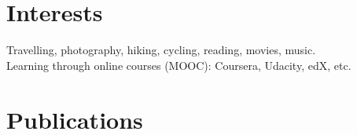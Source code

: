 \documentclass[a4paper,10pt]{article} %
\def \vspac {0.25cm}
\begin{document}
\vspace{\vspac}
\section{Interests}
\vspace{\vspac}
\noindent
Travelling, photography, hiking, cycling, reading, movies, music.  \\
\noindent
Learning through online courses (MOOC): Coursera, Udacity, edX, etc.

\vspace{\vspac}
\section{Publications}
\noindent
\begingroup
\renewcommand{\section}[2]{}%
\printbibliography[heading=bibintoc]
\endgroup
\end{document}
